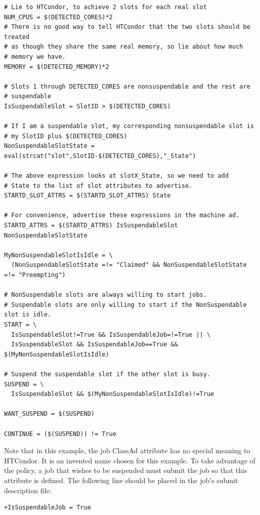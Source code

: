 \footnotesize
\begin{verbatim}
# Lie to HTCondor, to achieve 2 slots for each real slot
NUM_CPUS = $(DETECTED_CORES)*2
# There is no good way to tell HTCondor that the two slots should be treated
# as though they share the same real memory, so lie about how much
# memory we have.
MEMORY = $(DETECTED_MEMORY)*2

# Slots 1 through DETECTED_CORES are nonsuspendable and the rest are
# suspendable
IsSuspendableSlot = SlotID > $(DETECTED_CORES)

# If I am a suspendable slot, my corresponding nonsuspendable slot is
# my SlotID plus $(DETECTED_CORES)
NonSuspendableSlotState = eval(strcat("slot",SlotID-$(DETECTED_CORES),"_State")

# The above expression looks at slotX_State, so we need to add
# State to the list of slot attributes to advertise.
STARTD_SLOT_ATTRS = $(STARTD_SLOT_ATTRS) State

# For convenience, advertise these expressions in the machine ad.
STARTD_ATTRS = $(STARTD_ATTRS) IsSuspendableSlot NonSuspendableSlotState

MyNonSuspendableSlotIsIdle = \
  (NonSuspendableSlotState =!= "Claimed" && NonSuspendableSlotState =!= "Preempting")

# NonSuspendable slots are always willing to start jobs.
# Suspendable slots are only willing to start if the NonSuspendable slot is idle.
START = \
  IsSuspendableSlot!=True && IsSuspendableJob=!=True || \
  IsSuspendableSlot && IsSuspendableJob==True && $(MyNonSuspendableSlotIsIdle)

# Suspend the suspendable slot if the other slot is busy.
SUSPEND = \
  IsSuspendableSlot && $(MyNonSuspendableSlotIsIdle)!=True

WANT_SUSPEND = $(SUSPEND)

CONTINUE = ($(SUSPEND)) != True

\end{verbatim}
\normalsize

Note that in this example, the job ClassAd attribute 
has no special meaning to HTCondor.  It is an invented name chosen
for this example.
To take advantage of the policy, a job that wishes to be suspended
must submit the job so that this attribute is defined.
The following line should be placed in the job's submit description file:
\begin{verbatim}
+IsSuspendableJob = True
\end{verbatim}

